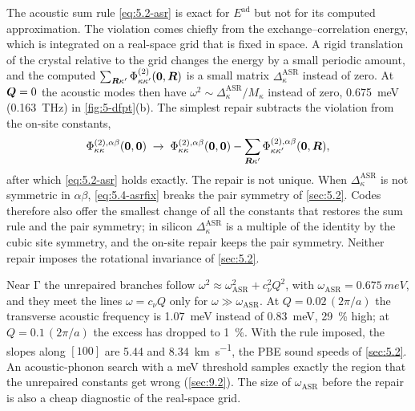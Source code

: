 The acoustic sum rule \cref{eq:5.2-asr} is exact for $E^{\mathrm{ad}}$ but not for its computed approximation. The violation comes chiefly from the exchange--correlation energy, which is integrated on a real-space grid that is fixed in space. A rigid translation of the crystal relative to the grid changes the energy by a small periodic amount, and the computed $\sum_{\bm{R}\kappa'}\Phi^{(2)}_{\kappa\kappa'}(\bm{0},\bm{R})$ is a small matrix $\Delta^{\mathrm{ASR}}_\kappa$ instead of zero. At $\bm{Q} = 0$ the acoustic modes then have $\omega^2 \sim \Delta^{\mathrm{ASR}}_\kappa/M_\kappa$ instead of zero, \SI{0.675}{meV} (\SI{0.163}{THz}) in \cref{fig:5-dfpt}(b). The simplest repair subtracts the violation from the on-site constants,
\begin{equation}
  \Phi^{(2),\alpha\beta}_{\kappa\kappa}(\bm{0},\bm{0}) \;\to\; \Phi^{(2),\alpha\beta}_{\kappa\kappa}(\bm{0},\bm{0}) - \sum_{\bm{R}\kappa'}\Phi^{(2),\alpha\beta}_{\kappa\kappa'}(\bm{0},\bm{R}) ,
  \label{eq:5.4-asrfix}
\end{equation}
after which \cref{eq:5.2-asr} holds exactly. The repair is not unique. When $\Delta^{\mathrm{ASR}}_\kappa$ is not symmetric in $\alpha\beta$, \cref{eq:5.4-asrfix} breaks the pair symmetry of \cref{sec:5.2}. Codes therefore also offer the smallest change of all the constants that restores the sum rule and the pair symmetry; in silicon $\Delta^{\mathrm{ASR}}_\kappa$ is a multiple of the identity by the cubic site symmetry, and the on-site repair keeps the pair symmetry. Neither repair imposes the rotational invariance of \cref{sec:5.2}.

Near $\mathrm{\Gamma}$ the unrepaired branches follow $\omega^2 \approx \omega_{\mathrm{ASR}}^2 + c_\nu^2Q^2$, with $\omega_{\mathrm{ASR}} = \SI{0.675}{meV}$, and they meet the lines $\omega = c_\nu Q$ only for $\omega \gg \omega_{\mathrm{ASR}}$. At $Q = 0.02\,(2\pi/a)$ the transverse acoustic frequency is \SI{1.07}{meV} instead of \SI{0.83}{meV}, \SI{29}{\percent} high; at $Q = 0.1\,(2\pi/a)$ the excess has dropped to \SI{1}{\percent}. With the rule imposed, the slopes along $[100]$ are 5.44 and \SI{8.34}{km.s^{-1}}, the PBE sound speeds of \cref{sec:5.2}. An acoustic-phonon search with a meV threshold samples exactly the region that the unrepaired constants get wrong (\cref{sec:9.2}). The size of $\omega_{\mathrm{ASR}}$ before the repair is also a cheap diagnostic of the real-space grid.
